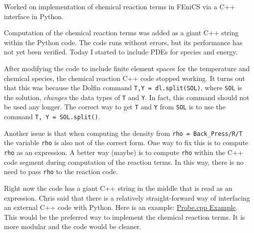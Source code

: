 

Worked on implementation of chemical reaction terms in FEniCS via a C++ interface in Python.


Computation of the chemical reaction terms was added as a giant C++ string within the Python code.  The code runs without errors, but its performance has not yet been verified.  Today I started to include PDEs for species and energy.


After modifying the \fenics code to include finite element spaces for the temperature and chemical species, the chemical reaction C++ code stopped working.  It turns out that this was because the Dolfin command \texttt{T,Y = dl.split(SOL)},  where \texttt{SOL} is the solution, \textit{changes} the data types of \texttt{T} and \texttt{Y}.  In fact, this command should not be used any longer.  The correct way to get \texttt{T} and \texttt{Y} from \texttt{SOL} is to use the command \texttt{T, Y = SOL.split()}.

Another issue is that when computing the density from \texttt{rho = Back\_Press/R/T} the variable \texttt{rho} is also not of the correct form.  One way to fix this is to compute \texttt{rho} as an expression.  A better way (maybe) is to compute \texttt{rho} within the C++ code segment during computation of the reaction terms.  In this way, there is no need to pass \texttt{rho} to the reaction code.


Right now the code has a giant C++ string in the middle that is read as an expression.  Chris said that there is a relatively straight-forward way of interfacing an external C++ code with Python.  Here is an example:  \href{http://hplgit.github.io/fenics-mixed/doc/pub/sphinx-cbc/.\_part0003\_fenics-mixed.html}{Probe.cpp Example}.  This would be the preferred way to implement the chemical reaction terms.  It is more modular and the code would be cleaner.


